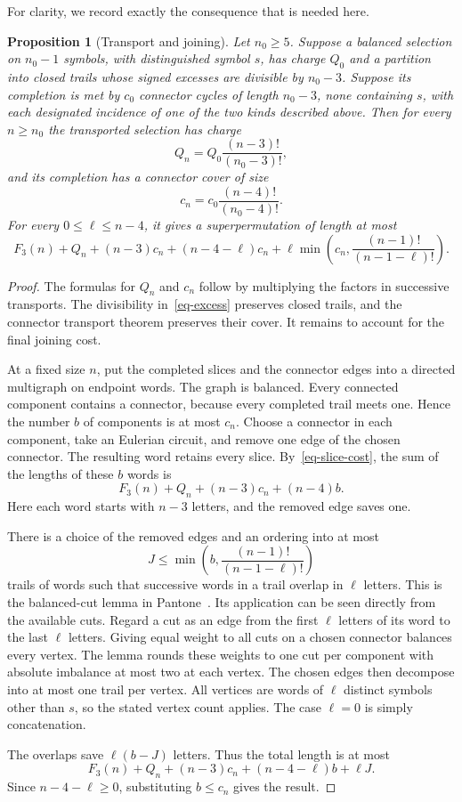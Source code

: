 \documentclass[11pt]{article}
\newtheorem{proposition}[theorem]{Proposition}
\newcommand{\F}{F_3}
\begin{document}
For clarity, we record exactly the consequence that is needed here.

\begin{proposition}[Transport and joining]\label{prop-transport}
Let $n_0\ge5$. Suppose a balanced selection on $n_0-1$ symbols, with distinguished
symbol $s$, has charge $Q_0$ and a partition into closed trails whose
signed excesses are divisible by $n_0-3$. Suppose its completion is met
by $c_0$ connector cycles of length $n_0-3$, none containing $s$, with
each designated incidence of one of the two kinds described above.
Then for every $n\ge n_0$ the transported selection has charge
\[
 Q_n=Q_0\frac{(n-3)!}{(n_0-3)!},
\]
and its completion has a connector cover of size
\[
 c_n=c_0\frac{(n-4)!}{(n_0-4)!}.
\]
For every $0\le\ell\le n-4$, it gives a superpermutation of length at most
\[
 \F(n)+Q_n+(n-3)c_n+(n-4-\ell)c_n
       +\ell\min\left(c_n,\frac{(n-1)!}{(n-1-\ell)!}\right).
\]
\end{proposition}

\begin{proof}
The formulas for $Q_n$ and $c_n$ follow by multiplying the factors in
successive transports. The divisibility in~\eqref{eq-excess} preserves
closed trails, and the connector transport theorem preserves their cover.
It remains to account for the final joining cost.

At a fixed size $n$, put the completed slices and the connector edges
into a directed multigraph on endpoint words. The graph is balanced.
Every connected component contains a connector, because every completed
trail meets one. Hence the number $b$ of components is at most $c_n$.
Choose a connector in each component, take an Eulerian circuit, and remove
one edge of the chosen connector. The resulting word retains every slice.
By~\eqref{eq-slice-cost}, the sum of the lengths of these $b$ words is
\[
 \F(n)+Q_n+(n-3)c_n+(n-4)b.
\]
Here each word starts with $n-3$ letters, and the removed edge saves one.

There is a choice of the removed edges and an ordering into at most
\[
 J\le\min\left(b,\frac{(n-1)!}{(n-1-\ell)!}\right)
\]
trails of words such that successive words in a trail overlap in $\ell$
letters. This is the balanced-cut lemma in Pantone~\cite{pantone}.
Its application can be seen directly from the available cuts. Regard a
cut as an edge from the first $\ell$ letters of its word to the last
$\ell$ letters. Giving equal weight to all cuts on a chosen connector
balances every vertex. The lemma rounds these weights to one cut per
component with absolute imbalance at most two at each vertex. The chosen
edges then decompose into at most one trail per vertex. All vertices are
words of $\ell$ distinct symbols other than $s$, so the stated vertex
count applies. The case $\ell=0$ is simply concatenation.

The overlaps save $\ell(b-J)$ letters. Thus the total length is at most
\[
 \F(n)+Q_n+(n-3)c_n+(n-4-\ell)b+\ell J.
\]
Since $n-4-\ell\ge0$, substituting $b\le c_n$ gives the result.
\end{proof}
\end{document}
